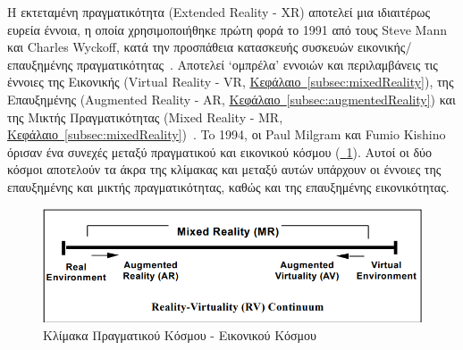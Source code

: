 
 Η εκτεταμένη πραγματικότητα (Extended Reality - XR) αποτελεί μια ιδιαιτέρως ευρεία έννοια, η οποία χρησιμοποιήθηκε πρώτη φορά το 1991 από τους Steve Mann και Charles Wyckoff, κατά την προσπάθεια κατασκευής συσκευών εικονικής/επαυξημένης πραγματικότητας~\cite{mann_2023_fundamentals}\cite{mann_1991_extended}. Αποτελεί `ομπρέλα' εννοιών και περιλαμβάνεις τις έννοιες της Εικονικής (Virtual Reality - VR, \hyperref[subsec:mixedReality]{Κεφάλαιο~\ref*{subsec:mixedReality}}), της Επαυξημένης (Augmented Reality - AR, \hyperref[subsec:augmentedReality]{Κεφάλαιο~\ref*{subsec:augmentedReality}}) και της Μικτής Πραγματικότητας (Mixed Reality - MR, \hyperref[subsec:mixedReality]{Κεφάλαιο~\ref*{subsec:mixedReality}})~\cite{milgram_1994_augmented}. To 1994, οι Paul Milgram και Fumio Kishino όρισαν ένα συνεχές μεταξύ πραγματικού και εικονικού κόσμου (\hyperref[fig:rv_continuum]{\schema~\ref*{fig:rv_continuum}}). Αυτοί οι δύο κόσμοι αποτελούν τα άκρα της κλίμακας και μεταξύ αυτών υπάρχουν οι έννοιες της επαυξημένης και μικτής πραγματικότητας, καθώς και της επαυξημένης εικονικότητας.
\begin{figure}[!h]
    \centering
    \includegraphics[width=120mm]{images/rv_continuum.png}
    \caption{Κλίμακα Πραγματικού Κόσμου - Εικονικού Κόσμου~\cite{milgram_1994_augmented}}\label{fig:rv_continuum}
\end{figure}


